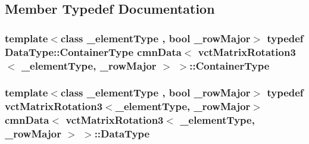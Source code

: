\subsection{Member Typedef Documentation}
\hypertarget{classcmn_data_3_01vct_matrix_rotation3_3_01__element_type_00_01__row_major_01_4_01_4_a220f0a68d567275fede9e0124441ae86}{
\subsubsection[{Container\-Type}]{\setlength{\rightskip}{0pt plus 5cm}template$<$class \-\_\-element\-Type , bool \-\_\-row\-Major$>$ typedef {\bf Data\-Type\-::\-Container\-Type} {\bf cmn\-Data}$<$ {\bf vct\-Matrix\-Rotation3}$<$ \-\_\-element\-Type, \-\_\-row\-Major $>$ $>$\-::{\bf Container\-Type}}}\label{classcmn_data_3_01vct_matrix_rotation3_3_01__element_type_00_01__row_major_01_4_01_4_a220f0a68d567275fede9e0124441ae86}
\hypertarget{classcmn_data_3_01vct_matrix_rotation3_3_01__element_type_00_01__row_major_01_4_01_4_a16ee28dba714864959664e5a1567db82}{
\subsubsection[{Data\-Type}]{\setlength{\rightskip}{0pt plus 5cm}template$<$class \-\_\-element\-Type , bool \-\_\-row\-Major$>$ typedef {\bf vct\-Matrix\-Rotation3}$<$\-\_\-element\-Type, \-\_\-row\-Major$>$ {\bf cmn\-Data}$<$ {\bf vct\-Matrix\-Rotation3}$<$ \-\_\-element\-Type, \-\_\-row\-Major $>$ $>$\-::{\bf Data\-Type}}}\label{classcmn_data_3_01vct_matrix_rotation3_3_01__element_type_00_01__row_major_01_4_01_4_a16ee28dba714864959664e5a1567db82}


